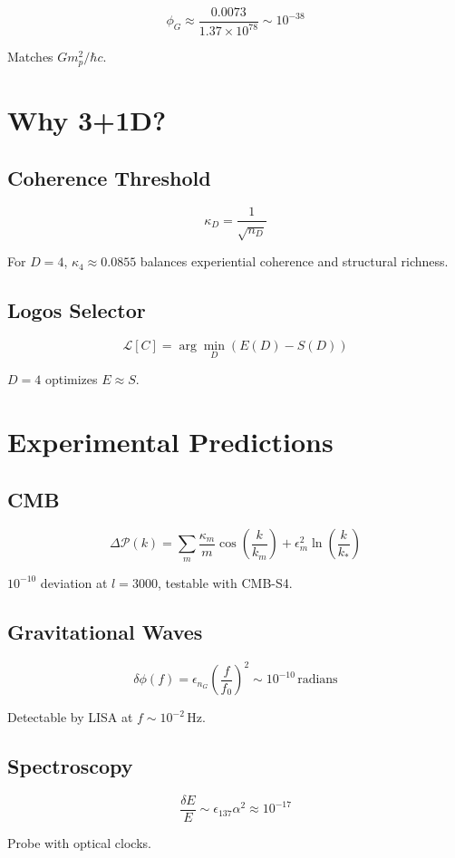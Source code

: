 \documentclass[12pt]{article}
\begin{document}
\[
\phi_G \approx \frac{0.0073}{1.37 \times 10^{78}} \sim 10^{-38}
\]

Matches \(G m_p^2 / \hbar c\).

\section{Why 3+1D?}

\subsection{Coherence Threshold}
\[
\kappa_D = \frac{1}{\sqrt{n_D}}
\]

For \(D = 4\), \(\kappa_4 \approx 0.0855\) balances experiential coherence and structural richness.

\subsection{Logos Selector}
\[
\mathcal{L}[C] = \arg\min_D (E(D) - S(D))
\]

\(D = 4\) optimizes \(E \approx S\).

\section{Experimental Predictions}

\subsection{CMB}
\[
\Delta \mathcal{P}(k) = \sum_m \frac{\kappa_m}{m} \cos\left(\frac{k}{k_m}\right) + \epsilon_m^2 \ln\left(\frac{k}{k_*}\right)
\]

\(10^{-10}\) deviation at \(l = 3000\), testable with CMB-S4.

\subsection{Gravitational Waves}
\[
\delta \phi(f) = \epsilon_{n_G} \left( \frac{f}{f_0} \right)^2 \sim 10^{-10} \, \text{radians}
\]

Detectable by LISA at \(f \sim 10^{-2} \, \text{Hz}\).

\subsection{Spectroscopy}
\[
\frac{\delta E}{E} \sim \epsilon_{137} \alpha^2 \approx 10^{-17}
\]

Probe with optical clocks.
\end{document}
